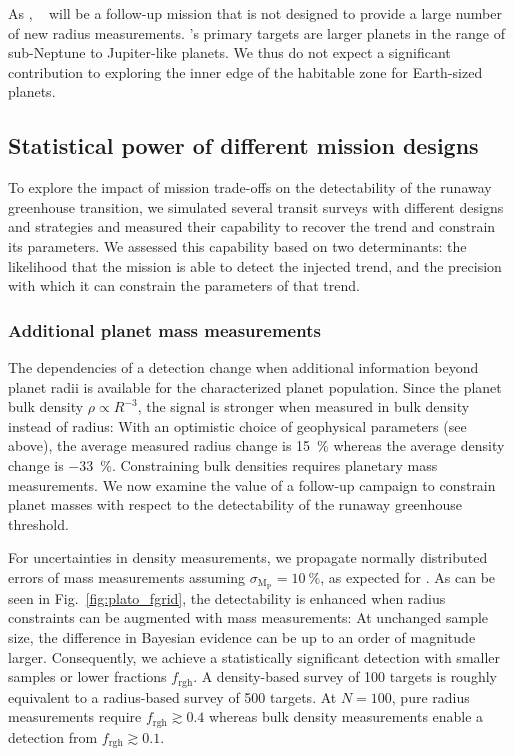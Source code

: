 \documentclass[twocolumn]{aastex631}
\begin{document}
As \cheops, \ariel~\citep{Puig2016} will be a follow-up mission that is not designed to provide a large number of new radius measurements.
\ariel's primary targets are larger planets in the range of sub-Neptune to Jupiter-like planets.
We thus do not expect a significant contribution to exploring the inner edge of the habitable zone for Earth-sized planets.


\subsection{Statistical power of different mission designs}\label{sec:statpower_missions}
To explore the impact of mission trade-offs on the detectability of the runaway greenhouse transition, we simulated several transit surveys with different designs and strategies and measured their capability to recover the trend and constrain its parameters.
We assessed this capability based on two determinants: the likelihood that the mission is able to detect the injected trend, and the precision with which it can constrain the parameters of that trend.

\subsubsection{Additional planet mass measurements}
The dependencies of a detection change when additional information beyond planet radii is available for the characterized planet population.
Since the planet bulk density $\rho \propto R^{-3}$, the signal is stronger when measured in bulk density instead of radius:
With an optimistic choice of geophysical parameters (see above), the average measured radius change is \SI{+15}{\percent} whereas the average density change is \SI{-33}{\percent}.
Constraining bulk densities requires planetary mass measurements.
We now examine the value of a follow-up campaign to constrain planet masses with respect to the detectability of the runaway greenhouse threshold.

For uncertainties in density measurements, we propagate normally distributed errors of mass measurements assuming $\sigma_\mathrm{M_\mathrm{P}} = \SI{10}{\percent}$, as expected for \plato.
As can be seen in Fig.~\ref{fig:plato_fgrid}, the detectability is enhanced when radius constraints can be augmented with mass measurements: At unchanged sample size, the difference in Bayesian evidence can be up to an order of magnitude larger.
Consequently, we achieve a statistically significant detection with smaller samples or lower fractions $f_\mathrm{rgh}$.
A density-based survey of 100 targets is roughly equivalent to a radius-based survey of 500 targets.
At $N=100$, pure radius measurements require $f_\mathrm{rgh} \gtrsim 0.4$ whereas bulk density measurements enable a detection from $f_\mathrm{rgh} \gtrsim 0.1$.
\end{document}

